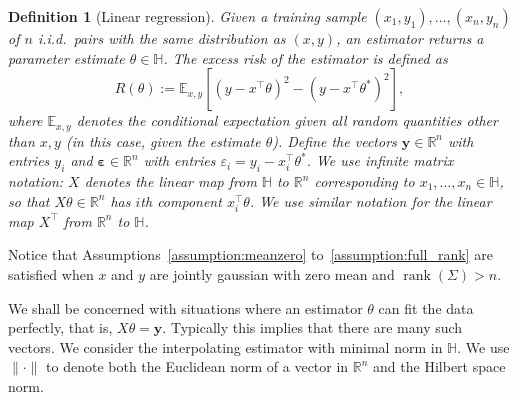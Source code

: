 \documentclass[11pt,notitlepage]{article}
\newcommand\bbH{\mathbb{H}}
\newcommand\E {\mathbb{E}}
\newcommand\Expect{\E}
\newcommand\R {\mathbb{R}}
\renewcommand\Re{\R}
\newcommand\bs {\boldsymbol}
\newcommand\eps {\varepsilon}
\newcommand\rank {\ensuremath{\operatorname{\mathrm{rank}}}}
\newtheorem{definition}[theorem]{Definition}
\begin{document}
\begin{definition}[Linear regression]
  Given a training sample $(x_1,y_1),\ldots,(x_n,y_n)$
  of $n$ i.i.d.~pairs with the same distribution as $(x,y)$,
  an {\em estimator} returns a parameter estimate $\theta\in\bbH$.
  The excess risk of the estimator is defined as
    \[
      R(\theta):=
        \Expect_{x,y}\left[
        \left(y-x^\top\theta\right)^2
        - \left(y-x^\top\theta^*\right)^2\right],
    \]
  where $\Expect_{x,y}$ denotes the conditional expectation given
  all random quantities other than $x,y$ (in this case, given the
  estimate $\theta$).
  Define the vectors $\bs{y}\in\Re^n$ with entries $y_i$ and
  $\bs{\eps}\in\Re^n$ with entries $\eps_i=y_i-
  x_i^\top\theta^*$.  We use infinite matrix notation: $X$
  denotes the linear map from $\bbH$ to $\Re^n$ corresponding to
  $x_1,\ldots,x_n\in\bbH$, so that $X\theta\in\Re^n$ has $i$th component
  $ x_i^\top\theta$. We use similar notation for the
  linear map $X^\top$ from $\Re^n$ to $\bbH$.
\end{definition}
Notice that Assumptions~\ref{assumption:meanzero}
to~\ref{assumption:full_rank} are satisfied when $x$ and $y$ are
jointly gaussian with zero mean and $\rank(\Sigma)>n$.

We shall be concerned with situations where an estimator $\theta$
can fit the data perfectly, that is, $X\theta=\bs{y}$.
Typically this implies that there are many such vectors. We consider the
interpolating estimator with minimal norm in $\bbH$.
We use $\|\cdot\|$ to denote both the
Euclidean norm of a vector in $\Re^n$ and the Hilbert space norm.
\end{document}
